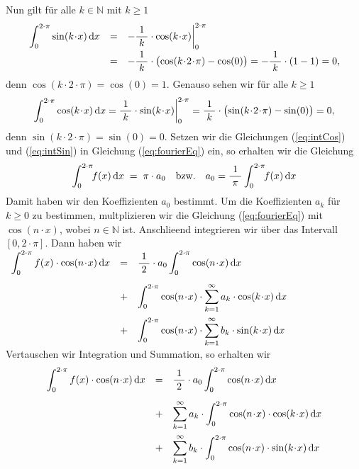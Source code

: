 Nun gilt f\"ur alle $k\in\mathbb{N}$ mit $k\geq 1$
\begin{equation}
  \label{eq:intSin}
  \begin{array}[t]{lcl}    
  \displaystyle \int_0^{2\cdot\pi} \sin(k\!\cdot\!x)\,\dr x & = &
 -\bruch{1}{k}\cdot\cos(k\!\cdot\!x) \bigg|_0^{2\cdot\pi} \\[0.3cm]
& = &
 -\bruch{1}{k}\cdot\bigl(\cos(k\!\cdot\!2\!\cdot\!\pi) - \cos(0)\bigr) = 
 -\bruch{1}{k}\cdot(1 - 1) = 0,
  \end{array}
\end{equation}
denn $\cos(k\!\cdot\!2\!\cdot\!\pi) = \cos(0) = 1$. Genauso sehen wir f\"ur alle $k\geq 1$
\begin{equation}
  \label{eq:intCos}
  \int_0^{2\cdot\pi} \cos(k\!\cdot\!x)\,\dr x = 
 \bruch{1}{k}\cdot\sin(k\!\cdot\!x) \bigg|_0^{2\cdot\pi} = 
 \bruch{1}{k}\cdot\bigl(\sin(k\!\cdot\!2\!\cdot\!\pi) - \sin(0)\bigr) = 0,
\end{equation}
denn $\sin(k\!\cdot\!2\!\cdot\!\pi) = \sin(0) = 0$.
Setzen wir die Gleichungen (\ref{eq:intCos}) und (\ref{eq:intSin}) in Gleichung
(\ref{eq:fourierEq}) ein, so erhalten wir die Gleichung
\begin{equation}
  \label{eq:fourierA0}
\int_0^{2\cdot\pi}\!\!f(x)\,\textrm{d} x \; = \; \pi\cdot a_0 \quad \mbox{bzw.}\quad a_0 = \displaystyle\frac{\;\displaystyle1\;}{\;\displaystyle\pi\;}\int_0^{2\cdot\pi}\!\!f(x)\,\textrm{d} x
\end{equation}
Damit haben wir  den Koeffizienten $a_0$ bestimmt.  Um die Koeffizienten 
$a_k$ f\"ur $k\geq 0$ zu bestimmen, 
multplizieren wir die Gleichung (\ref{eq:fourierEq}) mit $\cos(n\!\cdot\!x)$, wobei
$n\in\mathbb{N}$ ist.  Anschlie\3end integrieren wir  \"uber das
Intervall $[0,2\!\cdot\!\pi]$.  Dann haben wir
\\[0.3cm]
\hspace*{0.8cm}
$
\begin{array}[t]{lcl}
\displaystyle \int_0^{2\cdot\pi}f(x)\cdot\cos(n\!\cdot\!x)\,\dr x 
& = & \displaystyle \bruch{1}{2}\cdot a_0  \int_0^{2\cdot\pi} \cos(n\!\cdot\!x)\,\dr x  \\[0.5cm]
& + & \displaystyle \int_0^{2\cdot\pi} \cos(n\!\cdot\!x)\cdot\sum\limits_{k=1}^\infty a_k\cdot \cos(k\!\cdot\!x) \,\dr x \\[0.5cm]
& + & \displaystyle \int_0^{2\cdot\pi} \cos(n\!\cdot\!x)\cdot\sum\limits_{k=1}^\infty b_k\cdot \sin(k\!\cdot\!x) \,\dr x 
\end{array}
$
\\[0.3cm]
Vertauschen wir Integration und Summation, so erhalten wir
\begin{equation}
  \label{eq:fourierAk1}
\begin{array}[b]{lcl}
\displaystyle \int_0^{2\cdot\pi}f(x)\cdot\cos(n\!\cdot\!x)\,\dr x 
& = & \displaystyle \bruch{1}{2}\cdot a_0  \int_0^{2\cdot\pi} \cos(n\!\cdot\!x)\,\dr x  \\[0.5cm]
& + & \displaystyle \sum\limits_{k=1}^\infty a_k\cdot \int_0^{2\cdot\pi} \cos(n\!\cdot\!x)\cdot\cos(k\!\cdot\!x) \,\dr x \\[0.5cm]
& + & \displaystyle \sum\limits_{k=1}^\infty b_k\cdot \int_0^{2\cdot\pi} \cos(n\!\cdot\!x)\cdot\sin(k\!\cdot\!x) \,\dr x 
\end{array}  
\end{equation}
